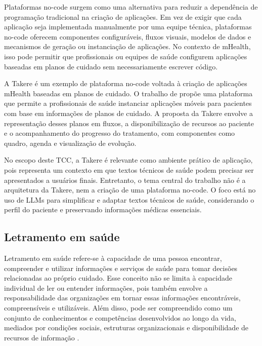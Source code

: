 Plataformas no-code surgem como uma alternativa para reduzir a dependência de programação tradicional na criação de aplicações. Em vez de exigir que cada aplicação seja implementada manualmente por uma equipe técnica, plataformas no-code oferecem componentes configuráveis, fluxos visuais, modelos de dados e mecanismos de geração ou instanciação de aplicações. No contexto de mHealth, isso pode permitir que profissionais ou equipes de saúde configurem aplicações baseadas em planos de cuidado sem necessariamente escrever código.

A Takere é um exemplo de plataforma no-code voltada à criação de aplicações mHealth baseadas em planos de cuidado. O trabalho de  propõe uma plataforma que permite a profissionais de saúde instanciar aplicações móveis para pacientes com base em informações de planos de cuidado. A proposta da Takere envolve a representação desses planos em fluxos, a disponibilização de recursos ao paciente e o acompanhamento do progresso do tratamento, com componentes como quadro, agenda e visualização de evolução.

No escopo deste TCC, a Takere é relevante como ambiente prático de aplicação, pois representa um contexto em que textos técnicos de saúde podem precisar ser apresentados a usuários finais. Entretanto, o tema central do trabalho não é a arquitetura da Takere, nem a criação de uma plataforma no-code. O foco está no uso de LLMs para simplificar e adaptar textos técnicos de saúde, considerando o perfil do paciente e preservando informações médicas essenciais.

\subsection{Letramento em saúde}
\label{sec:letramento-saude}

Letramento em saúde refere-se à capacidade de uma pessoa encontrar, compreender e utilizar informações e serviços de saúde para tomar decisões relacionadas ao próprio cuidado. Esse conceito não se limita à capacidade individual de ler ou entender informações, pois também envolve a responsabilidade das organizações em tornar essas informações encontráveis, compreensíveis e utilizáveis. Além disso, pode ser compreendido como um conjunto de conhecimentos e competências desenvolvidos ao longo da vida, mediados por condições sociais, estruturas organizacionais e disponibilidade de recursos de informação \cite{cdc2024healthliteracy,who2025healthliteracy}. 


